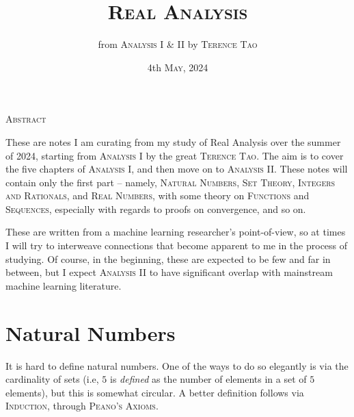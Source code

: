\documentclass[multi, tikz, 11pt]{article}
\title{\textsc{Real Analysis\vspace{-12pt}}}
\author{from \textsc{Analysis I \& II} by \textsc{Terence Tao}\\}
\date{4th \textsc{May}, 2024} %
\begin{document}
\maketitle

\begin{center}
    \textsc{Abstract}
    \vspace{-8pt}
\end{center}
\noindent %
  \begin{center}
\begin{minipage}{0.8\textwidth}
These are notes I am curating from my study of Real Analysis over the summer of 2024, starting from \textsc{Analysis I} by the great \textsc{Terence Tao}. The aim is to cover the five chapters of \textsc{Analysis I}, and then move on to \textsc{Analysis II}. These notes will contain only the first part -- namely, \textsc{Natural Numbers}, \textsc{Set Theory}, \textsc{Integers and Rationals}, and \textsc{Real Numbers}, with some theory on \textsc{Functions} and \textsc{Sequences}, especially with regards to proofs on convergence, and so on. 

These are written from a machine learning researcher's point-of-view, so at times I will try to interweave connections that become apparent to me in the process of studying. Of course, in the beginning, these are expected to be few and far in between, but I expect \textsc{Analysis II} to have significant overlap with mainstream machine learning literature.  
\end{minipage}
  \end{center}

\section{Natural Numbers}
It is hard to define natural numbers. One of the ways to do so elegantly is via the cardinality of sets (i.e, $5$ is \textit{defined} as the number of elements in a set of $5$ elements), but this is somewhat circular. A better definition follows via \textsc{Induction}, through \textsc{\color{red}Peano's Axioms}.
\end{document}
